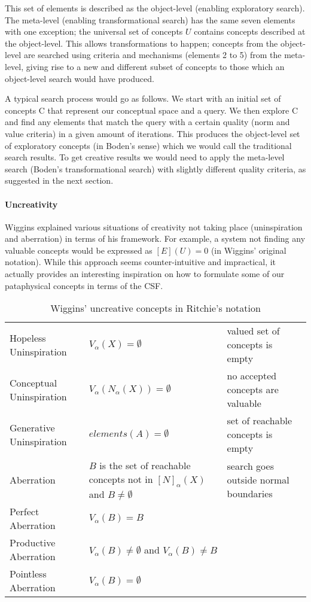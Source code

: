 This set of elements is described as the object-level (enabling exploratory search). The meta-level (enabling transformational search) has the same seven elements with one exception; the universal set of concepts $U$ contains concepts described at the object-level. This allows transformations to happen; concepts from the object-level are searched using criteria and mechanisms (elements 2 to 5) from the meta-level, giving rise to a new and different subset of concepts to those which an object-level search would have produced.

A typical search process would go as follows. We start with an initial set of concepts C that represent our conceptual space and a query. We then explore C and find any elements that match the query with a certain quality (norm and value criteria) in a given amount of iterations. This produces the object-level set of exploratory concepts (in Boden's sense) which we would call the traditional search results. To get creative results we would need to apply the meta-level search (Boden's transformational search) with slightly different quality criteria, as suggested in the next section.

\spirals

\paragraph{Uncreativity}
Wiggins explained various situations of creativity not taking place (uninspiration and aberration) in terms of his framework. For example, a system not finding any valuable concepts would be expressed as $[E](U) = 0$ (in Wiggins' original notation). While this approach seems counter-intuitive and impractical, it actually provides an interesting inspiration on how to formulate some of our pataphysical concepts in terms of the \ac{CSF}.

\begin{table}[!htbp]
\caption[Wiggins' uncreative concepts]{Wiggins' uncreative concepts in Ritchie's notation}
\label{tab:wiggins}
  \centering
  \begin{tabu}{XXX}
  \toprule
  Hopeless Uninspiration & $V_\alpha (X) = \emptyset$ & valued set of concepts is empty \\
  Conceptual Uninspiration & $V_\alpha (N_\alpha (X)) = \emptyset$ & no accepted concepts are valuable \\
  Generative Uninspiration & $elements(A) = \emptyset$ & set of reachable concepts is empty \\
  Aberration	& $B$ is the set of reachable concepts not in $[N]_\alpha (X)$ and $B \neq \emptyset$ & search goes outside normal boundaries \\
  Perfect Aberration & $V_\alpha (B) = B$ & \\
  Productive Aberration &	$V_\alpha (B) \neq \emptyset$ and $V_\alpha (B) \neq B$ & \\
  Pointless Aberration & $V_\alpha (B) = \emptyset$ & \\
  \bottomrule
  \end{tabu}
\end{table}

